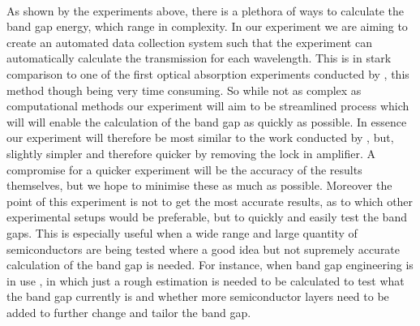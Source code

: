 \documentclass{article}
\begin{document}
\

As shown by the experiments above, there is a plethora of ways to calculate the band gap energy, which range in complexity. In our experiment we are aiming to create an automated data collection system such that the experiment can automatically calculate the transmission for each wavelength. This is in stark comparison to one of the first optical absorption experiments conducted by \citeauthor{first} \cite{first}, this method though being very time consuming. So while not as complex as computational methods our experiment will aim to be streamlined process which will will enable the calculation of the band gap as quickly as possible. In essence our experiment  will therefore be most similar to the work conducted by \citeauthor{martil1992undergraduate}, but, slightly simpler and therefore quicker by removing the lock in amplifier. A compromise for a quicker experiment will be the accuracy of the results themselves, but we hope to minimise these as much as possible. Moreover the point of this experiment is not to get the most accurate results, as to which other experimental setups would be preferable, but to quickly and easily test the band gaps. This is especially useful when a wide range and large quantity of semiconductors are being tested where a good idea but not supremely accurate calculation of the band gap is needed. For instance, when band gap engineering is in use \cite{Bao2015}, in which just a rough estimation is needed to be calculated to test what the band gap currently is and whether more semiconductor layers need to be added to further change and tailor the band gap.

\newpage
\printbibliography
\end{document}

